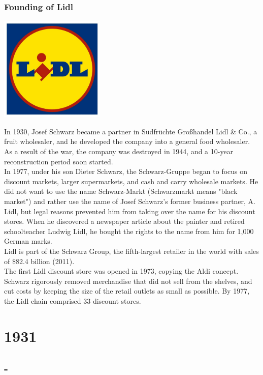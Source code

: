 \documentclass[11pt]{report}
\begin{document}
\subsection{Founding of Lidl}
\vspace{2mm}\begin{center}\includegraphics[width=5cm]{./img/lidlLogo.jpg}\end{center}
In 1930, Josef Schwarz became a partner in Südfrüchte Großhandel Lidl \& Co., a fruit wholesaler, and he developed the company into a general food wholesaler. As a result of the war, the company was destroyed in 1944, and a 10-year reconstruction period soon started.\\
\indent In 1977, under his son Dieter Schwarz, the Schwarz-Gruppe began to focus on discount markets, larger supermarkets, and cash and carry wholesale markets. He did not want to use the name Schwarz-Markt (Schwarzmarkt means "black market") and rather use the name of Josef Schwarz's former business partner, A. Lidl, but legal reasons prevented him from taking over the name for his discount stores. When he discovered a newspaper article about the painter and retired schoolteacher Ludwig Lidl, he bought the rights to the name from him for 1,000 German marks.\\
\indent Lidl is part of the Schwarz Group, the fifth-largest retailer in the world with sales of \$82.4 billion (2011).\\ \indent The first Lidl discount store was opened in 1973, copying the Aldi concept. Schwarz rigorously removed merchandise that did not sell from the shelves, and cut costs by keeping the size of the retail outlets as small as possible. By 1977, the Lidl chain comprised 33 discount stores.

\chapter{1931}
\section{-}
\end{document}
